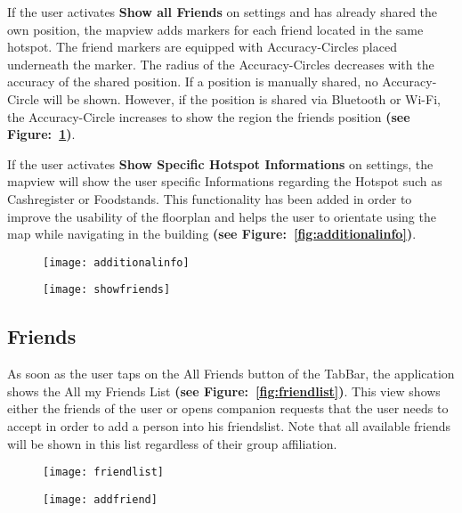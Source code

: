 If the user activates \textbf{Show all Friends} on settings and has already shared the own position, the mapview adds markers for each friend located in the same hotspot. The friend markers are equipped with Accuracy-Circles placed underneath the marker. The radius of the Accuracy-Circles decreases with the accuracy of the shared position. If a position is manually shared, no Accuracy-Circle will be shown. However, if the position is shared via Bluetooth or Wi-Fi, the Accuracy-Circle increases to show the region the friends position \textbf{(see Figure:~\ref{fig:showfriends})}.

If the user activates \textbf{Show Specific Hotspot Informations} on settings, the mapview will show the user specific Informations regarding the Hotspot such as Cashregister or Foodstands. This functionality has been added in order to improve the usability of the floorplan and helps the user to orientate using the map while navigating in the building \textbf{(see Figure:~\ref{fig:additionalinfo})}.

\begin{figure}
\centering
\begin{minipage}{.5\textwidth}
  \centering
  \texttt{[image: additionalinfo]}
  \label{fig:additionalinfo}
\end{minipage}%
\begin{minipage}{.5\textwidth}
  \centering
  \texttt{[image: showfriends]}
  \label{fig:showfriends}
\end{minipage}
\end{figure}


\subsection{Friends}

As soon as the user taps on the All Friends button of the TabBar, the application shows the All my Friends List \textbf{(see Figure:~\ref{fig:friendlist})}. This view shows either the friends of the user or opens companion requests that the user needs to accept in order to add a person into his friendslist. Note that all available friends will be shown in this list regardless of their group affiliation.

\begin{figure}
\centering
\begin{minipage}{.5\textwidth}
  \centering
  \texttt{[image: friendlist]}
  \label{fig:friendlist}
\end{minipage}%
\begin{minipage}{.5\textwidth}
  \centering
  \texttt{[image: addfriend]}
  \label{fig:addfriend}
\end{minipage}
\end{figure}

